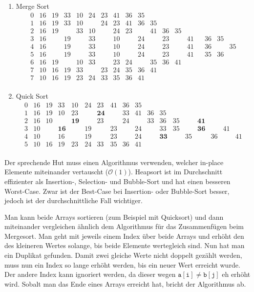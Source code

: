 \documentclass[a4paper,11pt]{article}             %
\begin{document}
\begin{enumerate}
\item Merge Sort
\begin{equation*}
\begin{array}{l|ccccccccccccccccc}
0&16&19&33&10&24&23&41&36&35\\
1&16&19&33&10&&24&23&41&36&35\\
2&16&19&&33&10&&24&23&&41&36&35\\
3&16&&19&&33&&10&&24&&23&&41&&36&35\\
4&16&&19&&33&&10&&24&&23&&41&&36&&35\\
5&16&&19&&33&&10&&24&&23&&41&&35&36\\
6&16&19&&10&33&&23&24&&35&36&41\\
7&10&16&19&33&&23&24&35&36&41\\
7&10&16&19&23&24&33&35&36&41\\
\end{array}
\end{equation*}

\item Quick Sort
\begin{equation*}
\begin{array}{l|ccccccccccccccccc}
0&16&19&33&10&24&23&41&36&35\\
1&16&19&10&23&&\textbf{24}&&33&41&36&35\\
2&16&10&&\textbf{19}&&23&&24&&33&36&35&&\textbf{41}\\
3&10&&\textbf{16}&&19&&23&&24&&33&35&&\textbf{36}&&41\\
4&10&&16&&19&&23&&24&&\textbf{33}&&35&&36&&41\\
5&10&16&19&23&24&33&35&36&41\\
\end{array}
\end{equation*}

\end{enumerate}


Der sprechende Hut muss einen Algorithmus verwenden, welcher in-place Elemente miteinander vertauscht ($\mathcal{O}(1)$). Heapsort ist im Durchschnitt effizienter als Insertion-, Selection- und Bubble-Sort und hat einen besseren Worst-Case. Zwar ist der Best-Case bei Insertion- oder Bubble-Sort besser, jedoch ist der durchschnittliche Fall wichtiger.


Man kann beide Arrays sortieren (zum Beispiel mit Quicksort) und dann miteinander vergleichen ähnlich dem Algorithmus für das Zusammenfügen beim Mergesort. Man geht mit jeweils einem Index über beide Arrays und erhöht den des kleineren Wertes solange, bis beide Elemente wertegleich sind. Nun hat man ein Duplikat gefunden. Damit zwei gleiche Werte nicht doppelt gezählt werden, muss nun ein Index so lange erhöht werden, bis ein neuer Wert erreicht wurde. Der andere Index kann ignoriert werden, da dieser wegen $\mathtt{a[i]\neq b[j]}$ eh erhöht wird. Sobalt man das Ende eines Arrays erreicht hat, bricht der Algorithmus ab.
\end{document}
